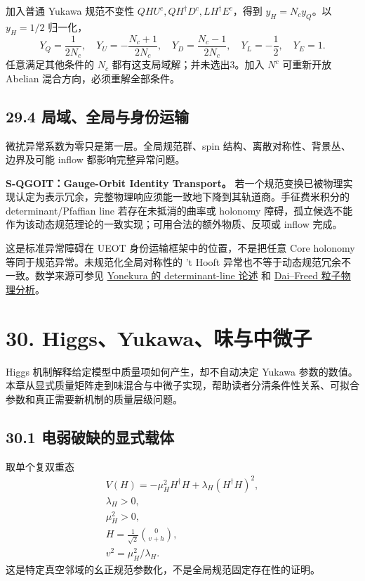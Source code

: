 \documentclass[
  11pt,
  oneside]{book}
\begin{document}
加入普通 Yukawa 规范不变性 \(QHU^c,QH^\dagger D^c,LH^\dagger E^c\)，得到
\(y_H=N_cy_Q\)。以 \(y_H=1/2\) 归一化， \[
Y_Q=\frac1{2N_c},\quad
Y_U=-\frac{N_c+1}{2N_c},\quad
Y_D=\frac{N_c-1}{2N_c},\quad Y_L=-\frac12,\quad Y_E=1.
\] 任意满足其他条件的 \(N_c\) 都有这支局域解；并未选出3。加入 \(N^c\)
可重新开放 Abelian 混合方向，必须重解全部条件。

\section{29.4 局域、全局与身份运输}

微扰异常系数为零只是第一层。全局规范群、spin
结构、离散对称性、背景丛、边界及可能 inflow 都影响完整异常问题。

\textbf{S-QGOIT：Gauge-Orbit Identity Transport。}
若一个规范变换已被物理实现认定为表示冗余，完整物理响应须能一致地下降到其轨道商。手征费米积分的
determinant/Pfaffian line 若存在未抵消的曲率或 holonomy
障碍，孤立候选不能作为该动态规范理论的一致实现；可用合法的额外物质、反项或
inflow 完成。

这是标准异常障碍在 UEOT 身份运输框架中的位置，不是把任意 Core holonomy
等同于规范异常。未规范化全局对称性的 't Hooft
异常也不等于动态规范冗余不一致。数学来源可参见
\href{https://arxiv.org/abs/1607.01873}{Yonekura 的 determinant-line
论述} 和 \href{https://arxiv.org/abs/1808.00009}{Dai--Freed
粒子物理分析}。

\chapter{30. Higgs、Yukawa、味与中微子}\label{ch-30}\hypertarget{ch-30}{}

Higgs 机制解释给定模型中质量项如何产生，却不自动决定 Yukawa
参数的数值。本章从显式质量矩阵走到味混合与中微子实现，帮助读者分清条件性关系、可拟合参数和真正需要新机制的质量层级问题。

\section{30.1 电弱破缺的显式载体}

取单个复双重态 \[
\begin{gathered}
V(H)=-\mu_H^2H^\dagger H+\lambda_H(H^\dagger H)^2,
\\ \lambda_H>0,\\ \mu_H^2>0,\\
H=\frac1{\sqrt2}\binom{0}{v+h},\\ v^2=\mu_H^2/\lambda_H.
\end{gathered}
\] 这是特定真空邻域的幺正规范参数化，不是全局规范固定存在性的证明。
\end{document}
